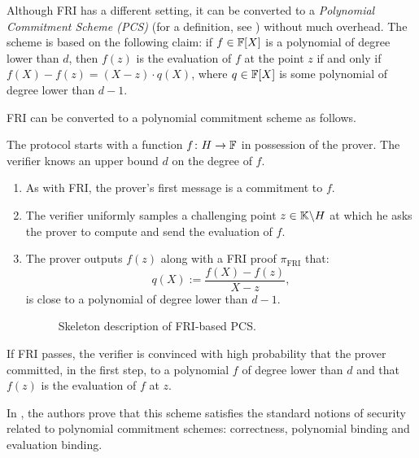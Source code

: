 Although FRI has a different setting, it can be converted to a \textit{Polynomial Commitment Scheme (PCS)} (for a definition, see \cite{AC:KatZavGol10}) without much overhead. The scheme is based on the following claim: if $f \in \mathbb{F}[X]$ is a polynomial of degree lower than $d$, then $f(z)$ is the evaluation of $f$ at the point $z$ if and only if $f(X) - f(z) = (X - z) \cdot q(X)$, where $q \in \mathbb{F}[X]$ is some polynomial of degree lower than $d-1$. 

FRI can be converted to a polynomial commitment scheme as follows. 
\begin{protocol}
The protocol starts with a function $f \colon H \to \mathbb{F}$ in possession of the prover. The verifier knows an upper bound $d$ on the degree of $f$.
\begin{enumerate}
  \item As with FRI, the prover's first message is a commitment to $f$. 
  \item The verifier uniformly samples a challenging point $z \in \mathbb{K} \backslash H$ at which he asks the prover to compute and send the evaluation of $f$.
  \item The prover outputs $f(z)$ along with a FRI proof $\pi_{\text{FRI}}$ that:
  \[
    q(X) := \frac{f(X) - f(z)}{X - z},
  \]
  is close to a polynomial of degree lower than $d-1$.
  \begin{figure}[H]
  \caption{Skeleton description of FRI-based PCS.}
  \end{figure}
\end{enumerate} 
If FRI passes, the verifier is convinced with high probability that the prover committed, in the first step, to a polynomial $f$ of degree lower than $d$ and that $f(z)$ is the evaluation of $f$ at $z$.
\end{protocol}

In \cite{EPRINT:VlaPan19}, the authors prove that this scheme satisfies the standard notions of security related to polynomial commitment schemes: correctness, polynomial binding and evaluation binding.




